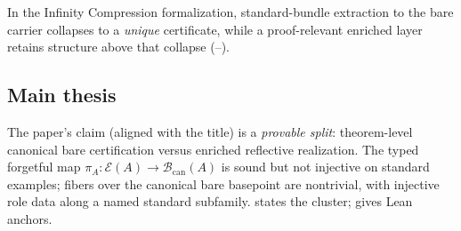 \documentclass[11pt]{article}
\begin{document}
In the Infinity Compression formalization, standard-bundle extraction to the bare carrier collapses to a \emph{unique} certificate, while a proof-relevant enriched layer retains structure above that collapse (--).

\subsection{Main thesis}\label{sec:intro-thesis}
The paper's claim (aligned with the title) is a \emph{provable split}: theorem-level canonical bare certification versus enriched reflective realization. The typed forgetful map $\pi_A : \mathcal{E}(A) \to \mathcal{B}_{\mathrm{can}}(A)$ is sound but not injective on standard examples; fibers over the canonical bare basepoint are nontrivial, with injective role data along a named standard subfamily.  states the cluster;  gives Lean anchors.
\end{document}
